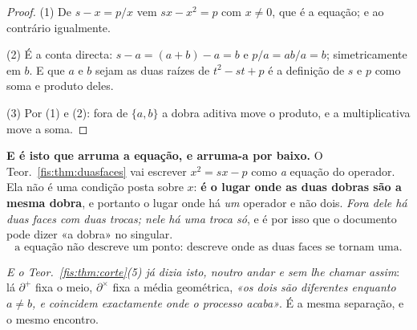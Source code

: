 \documentclass[livro.tex]{subfiles}
\begin{document}
\begin{proof}
(1) De $s-x=p/x$ vem $sx-x^{2}=p$ com $x\neq0$, que é a equação; e ao contrário
igualmente.

(2) É a conta directa: $s-a=(a+b)-a=b$ e $p/a=ab/a=b$; simetricamente em $b$. E
que $a$ e $b$ sejam as duas raízes de $t^{2}-st+p$ é a definição de $s$ e $p$
como soma e produto deles.

(3) Por (1) e (2): fora de $\{a,b\}$ a dobra aditiva move o produto, e a
multiplicativa move a soma.
\end{proof}

\medskip\noindent\textbf{E é isto que arruma a equação, e arruma-a por baixo.} O
Teor.~\ref{fis:thm:duasfaces} vai escrever $x^{2}=sx-p$ como \emph{a} equação do
operador. Ela não é uma condição posta sobre $x$: \textbf{é o lugar onde as duas
dobras são a mesma dobra}, e portanto o lugar onde há \emph{um} operador e não
dois. \emph{Fora dele há duas faces com duas trocas; nele há uma troca só}, e é
por isso que o documento pode dizer «a dobra» no singular.
\[
\boxed{\;\text{a equação não descreve um ponto: descreve onde as duas faces se tornam uma.}\;}
\]

\medskip\noindent\emph{E o Teor.~\ref{fis:thm:corte}(5) já dizia isto, noutro
andar e sem lhe chamar assim}: lá $\partial^{+}$ fixa o meio, $\partial^{\times}$
fixa a média geométrica, \emph{«os dois são diferentes enquanto $a\neq b$, e
coincidem exactamente onde o processo acaba»}. É a mesma separação, e o mesmo
encontro.
\end{document}
